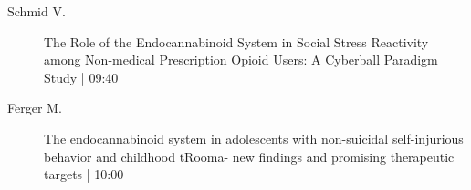 \begin{symposium}
\begin{description}
                \item [ Schmid V.] The Role of the Endocannabinoid System in Social Stress Reactivity among Non-medical Prescription Opioid Users: A Cyberball Paradigm Study  \textcolor{mygray}{ | 09:40}    
                
                \item [ Ferger M.] The endocannabinoid system in adolescents with non-suicidal self-injurious behavior and childhood tRooma- new findings and promising therapeutic targets \textcolor{mygray}{ | 10:00}    
                
            \end{description} 
            \end{symposium}
            